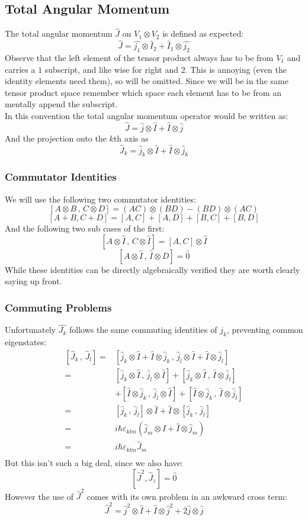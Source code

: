 \subsection{Total Angular Momentum}
The total angular momentum $\hat{J}$ on $V_1\otimes V_2$ is defined as expected:
\[\hat{J} = \hat{j_1}\otimes\hat{I}_2+\hat{I}_1\otimes\hat{j_2}\]
Observe that the left element of the tensor product always has to be from $V_1$ and carries a $1$ subscript,
and like wise for right and $2$.
This is annoying (even the identity elements need them),
so will be omitted.
Since we will be in the same tensor product space remember which space each element has to be from an mentally append the subscript.
\\

In this convention the total angular momentum operator would be written as:
\[\hat{J} = \hat{j}\otimes\hat{I}+\hat{I}\otimes\hat{j}\]
And the projection onto the $k$th axis as
\[\hat{J}_k = \hat{j}_k\otimes\hat{I}+\hat{I}\otimes\hat{j}_k\]

\subsubsection{Commutator Identities}
We will use the following two commutator identities:
\[[A\otimes B\,,\,C\otimes D] = (AC)\otimes(BD)-(BD)\otimes(AC)\]
\[[A+B,C+D] = [A,C]+[A,D]+[B,C]+[B,D]\]
And the following two sub cases of the first:
\[[A\otimes \hat{I}\,,\,C\otimes \hat{I}] = [A,C]\otimes\hat{I}\]
\[[A\otimes \hat{I}\,,\,\hat{I}\otimes D] =\hat{0}\]
While these identities can be directly algebraically verified they are worth clearly saying up front.

\subsubsection{Commuting Problems}
Unfortunately $\hat{J_k}$ follows the same commuting identities of $\hat{j_k}$,
preventing common eigenstates:
\begin{equation*}
\begin{aligned}
	[\hat{J}_k\,,\,\hat{J}_l] =& [\hat{j}_k\otimes\hat{I}+\hat{I}\otimes\hat{j}_k\,,\,\hat{j}_l\otimes\hat{I}+\hat{I}\otimes\hat{j}_l] \\
	=&[\hat{j}_k\otimes\hat{I}\,,\,\hat{j}_l\otimes\hat{I}]+[\hat{j}_k\otimes\hat{I}\,,\,\hat{I}\otimes\hat{j}_l] \\
	&+[\hat{I}\otimes\hat{j}_k\,,\,\hat{j}_l\otimes\hat{I}]+[\hat{I}\otimes\hat{j}_k\,,\,\hat{I}\otimes\hat{j}_l] \\
	=& [\hat{j}_k\,,\,\hat{j}_l]\otimes \hat{I}+\hat{I}\otimes[\hat{j}_k\,,\,\hat{j}_l]\\
	=& i\hbar\varepsilon_{klm}(\hat{j}_m\otimes\hat{I}+\hat{I}\otimes\hat{j}_m)\\
	=& i\hbar\varepsilon_{klm}\hat{J}_m\\
\end{aligned}
\end{equation*}
But this isn't such a big deal,
since we also have:
\[[\hat{J}^2,\hat{J}_z]=\hat{0}\]
However the use of $\hat{J}^2$ comes with its own problem in an awkward cross term: 
\[\hat{J}^2 = \hat{j}^2\otimes\hat{I}+\hat{I}\otimes\hat{j}^2+2\hat{j}\otimes\hat{j}\]

